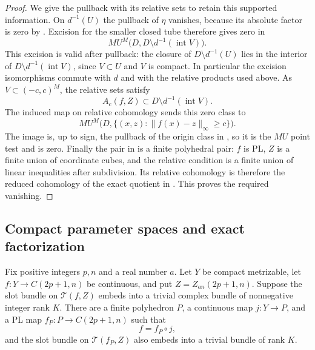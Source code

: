 \begin{proof}
We give the pullback with its relative sets to retain this supported
information.  On $d^{-1}(U)$ the pullback of $\eta$ vanishes, because
its absolute factor is zero by .  Excision
for the smaller closed tube therefore gives zero in
\[
 MU^M\bigl(D,D\setminus d^{-1}(\operatorname{int}V)\bigr).
\]
This excision is valid after pullback: the closure of
$D\setminus d^{-1}(U)$ lies in the interior of
$D\setminus d^{-1}(\operatorname{int}V)$, since $V\subset U$ and
$V$ is compact.  In particular the excision isomorphisms commute
with $d$ and with the relative products used above.
As $V\subset(-c,c)^M$, the relative sets satisfy
\[
 A_c(f,Z)\subset D\setminus d^{-1}(\operatorname{int}V).
\]
The induced map on relative cohomology sends this zero class to
\begin{equation}
 \label{eq:point-test-relative-mu}
 MU^M\bigl(D,\{(x,z):\|f(x)-z\|_\infty\ge c\}\bigr).
\end{equation}
The image is, up to sign, the pullback of the origin class in
, so it is the $MU$ point test and is
zero.  Finally the pair in  is a
finite polyhedral pair: $f$ is PL, $Z$ is a finite union of
coordinate cubes, and the relative condition is a finite union of
linear inequalities after subdivision.  Its relative cohomology
is therefore the reduced cohomology of the exact quotient in
.  This proves the required vanishing.
\end{proof}

\subsection{Compact parameter spaces and exact factorization}

\begin{lemma}
\label{lem:finite-parameter-reduction}
Fix positive integers $p,n$ and a real number $a$.
Let $Y$ be compact metrizable, let $f:Y\to C(2p+1,n)$ be
continuous, and put $Z=Z_{an}(2p+1,n)$.  Suppose the slot bundle on
$\mathcal T(f,Z)$ embeds into a trivial complex bundle of nonnegative integer rank $K$.
There are a finite polyhedron $P$, a continuous map $j:Y\to P$,
and a PL map $f_P:P\to C(2p+1,n)$ such that
\[
 f=f_P\circ j,
\]
and the slot bundle on $\mathcal T(f_P,Z)$ also embeds into a
trivial bundle of rank $K$.
\end{lemma}

